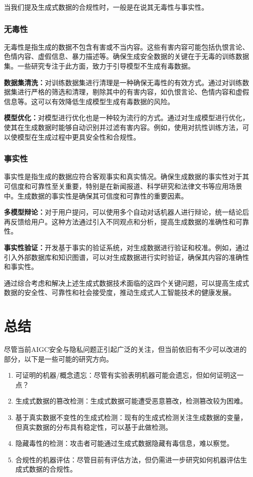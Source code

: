 \documentclass[a4paper]{nuist}
\begin{document}
当我们提及生成式数据的合规性时，一般是在说其无毒性与事实性。

\subsubsection{无毒性}

无毒性是指生成的数据不包含有害或不当内容。这些有害内容可能包括仇恨言论、色情内容、虚假信息、暴力描述等。确保生成安全数据的关键在于无毒的训练数据集。一些研究专注于此方面，致力于引导模型不生成有毒数据。

\textbf{数据集清洗：}对训练数据集进行清理是一种确保无毒性的有效方式。通过对训练数据集进行严格的筛选和清理，剔除其中的有害内容，如仇恨言论、色情内容和虚假信息等。这可以有效降低生成模型生成有毒数据的风险。

\textbf{模型优化：}对模型进行优化也是一种较为流行的方式。通过对生成模型进行优化，使其在生成数据时能够自动识别并过滤有害内容。例如，使用对抗性训练方法，可以使模型在生成过程中更具安全性和合规性。

\subsubsection{事实性}

事实性是指生成的数据应符合客观事实和真实情况。确保生成数据的事实性对于其可信度和可靠性至关重要，特别是在新闻报道、科学研究和法律文书等应用场景中。生成数据的事实性是确保其可信度和可靠性的重要因素。

\textbf{多模型辩论：}对于用户提问，可以使用多个自动对话机器人进行辩论，统一结论后再反馈给用户。这种方法通过引入不同观点和分析，提高生成数据的准确性和可靠性。

\textbf{事实性验证：}开发基于事实的验证系统，对生成数据进行验证和校准。例如，通过引入外部数据库和知识图谱，可以对生成数据进行实时验证，确保其内容的准确性和事实性。

通过综合考虑和解决上述生成式数据技术面临的这四个关键问题，可以提高生成式数据的安全性、可靠性和社会接受度，推动生成式人工智能技术的健康发展。

\section{总结}

尽管当前AIGC安全与隐私问题正引起广泛的关注，但当前依旧有不少可以改进的部分，以下是一些可能的研究方向。
\begin{enumerate}
    \item 可证明的机器/概念遗忘：尽管有实验表明机器可能会遗忘，但如何证明这一点？
    \item 生成式数据的篡改检测：生成式数据可能遭受恶意篡改，检测篡改较为困难。
    \item 基于真实数据不变性的生成式检测：现有的生成式检测关注生成数据的变量，但真实数据的分布具有稳定性，可以基于此做检测。
    \item 隐藏毒性的检测：攻击者可能通过生成式数据隐藏有毒信息，难以察觉。
    \item 合规性的机器评估：尽管目前有评估方法，但仍需进一步研究如何机器评估生成式数据的合规性。
\end{enumerate}



\end{document}
